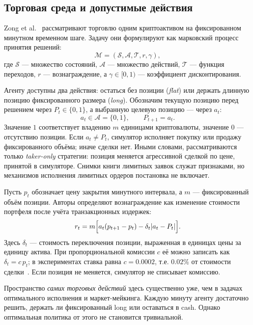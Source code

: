 \documentclass[9pt,a4paper,twocolumn]{extarticle}
\begin{document}
\subsection{Торговая среда и допустимые действия}

Zong et al.~\cite{zong2024macrohft} рассматривают торговлю одним криптоактивом на фиксированном
минутном временном шаге. Задачу они формулируют как марковский процесс принятия решений:
\begin{equation}
  \mathcal{M}
  =(\mathcal{S},\mathcal{A},\mathcal{T},r,\gamma),
  \label{eq:mdp}
\end{equation}
где $\mathcal{S}$ --- множество состояний, $\mathcal{A}$ --- множество действий,
$\mathcal{T}$ --- функция переходов, $r$ --- вознаграждение, а $\gamma\in[0,1)$ --- коэффициент
дисконтирования.

Агенту доступны два действия: остаться без позиции (\emph{flat}) или держать длинную позицию
фиксированного размера (\emph{long}). Обозначим текущую позицию перед решением через
$P_t\in\{0,1\}$, а выбранную целевую позицию --- через $a_t$:
\begin{equation}
  a_t\in\mathcal{A}=\{0,1\},
  \qquad P_{t+1}=a_t.
  \label{eq:action}
\end{equation}
Значение $1$ соответствует владению $m$ единицами криптовалюты, значение $0$ --- отсутствию
позиции. Если $a_t\ne P_t$, симулятор исполняет покупку или продажу фиксированного объёма; иначе
сделки нет. Иными словами, рассматриваются только \emph{taker-only} стратегии: позиция меняется
агрессивной сделкой по цене, принятой в симуляторе. Снимки книги лимитных заявок служат
признаками, но механизмов исполнения лимитных ордеров постановка не включает.

Пусть $p_t$ обозначает цену закрытия минутного интервала, а $m$ --- фиксированный объём позиции.
Авторы определяют вознаграждение как изменение стоимости портфеля после учёта транзакционных
издержек:
\begin{equation}
  r_t=m\Bigl[
    a_t(p_{t+1}-p_t)
    -\delta_t\lvert a_t-P_t\rvert
  \Bigr].
  \label{eq:reward}
\end{equation}
Здесь $\delta_t$ --- стоимость переключения позиции, выраженная в единицах цены за единицу
актива. При пропорциональной комиссии $c$ её можно записать как $\delta_t=c\,p_t$; в
экспериментах ставка равна $c=0.0002$, т.е. $0.02\%$ от стоимости
сделки~\cite{zong2024macrohft}. Если позиция не меняется, симулятор не списывает комиссию.

Пространство \emph{самих торговых действий} здесь существенно уже, чем в задачах оптимального
исполнения и маркет-мейкинга. Каждую минуту агенту достаточно решить, держать ли фиксированный
long или оставаться в cash. Однако оптимальная политика от этого не становится тривиальной.
\end{document}
